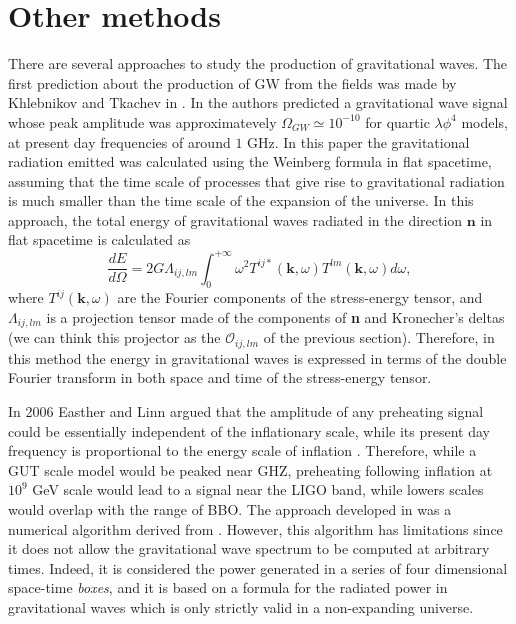 \documentclass[11pt,a4paper,twoside]{book}
\begin{document}
\section{Other methods}
There are several approaches to study the production of gravitational waves. The first prediction about the production of GW from the fields was made by Khlebnikov and Tkachev in \cite{Chap7:WeinbergBoxMethod}. In \cite{Chap7:WeinbergBoxMethod} the authors predicted a gravitational wave signal whose peak amplitude was approximatevely $ \Omega_{GW}  \simeq 10^{-10}$ for quartic $\lambda \phi^{4}$ models, at present day frequencies of around $ 1$ GHz. In this paper the gravitational radiation emitted was calculated using the Weinberg formula in flat spacetime, assuming that the time scale of processes that give rise to gravitational radiation is much smaller than the time scale of the expansion of the universe. In this approach, the total energy of gravitational waves radiated in the direction $ \textbf{n} $ in flat spacetime  is calculated as
\begin{equation}
\label{Chap7:WeinbergFormula}
\frac{dE}{d\Omega} = 2 G \Lambda_{ij,lm}\int_{0}^{+\infty} \omega^{2} T^{ij*}(\textbf{k},\omega)T^{lm}(\textbf{k},\omega)d\omega,
\end{equation}
where $ T^{ij}(\textbf{k},\omega) $ are the Fourier components of the stress-energy tensor, and $ \Lambda_{ij,lm} $ is a projection tensor made of the components of \textbf{n} and Kronecher's deltas (we can think this projector as the $ \mathcal{O}_{ij,lm} $ of the previous section). Therefore, in this method the energy in gravitational waves is expressed in terms of the double Fourier transform in both space and time of the stress-energy tensor.

In 2006 Easther and Linn argued that the amplitude  of any preheating signal could be essentially independent of the inflationary scale, while its present day frequency is proportional to the energy scale of inflation \cite{Chap7:BoxMethod}. Therefore, while a GUT scale model would be peaked near GHZ, preheating following inflation at $ 10^{9} $ GeV scale would lead to a signal near the LIGO band, while lowers scales would overlap with the range of BBO. The approach developed in \cite{Chap7:BoxMethod} was a numerical algorithm derived from \cite{Chap7:WeinbergBoxMethod}. However, this algorithm has limitations since it does not allow the gravitational wave spectrum to be computed at arbitrary times. Indeed, it is considered the power generated in a series of four dimensional space-time \textit{boxes}, and it is based on a formula for the radiated power in gravitational waves which is only strictly valid in a non-expanding universe.
\end{document}
